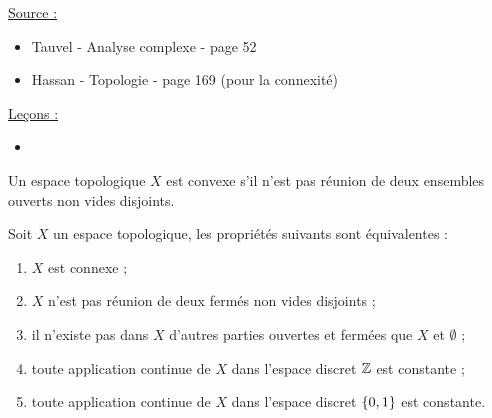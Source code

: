 

\pagestyle{fancy}

\fancyhead[C]{}
\fancyhead[R]{}



\underline{Source :} 

\begin{itemize}
\item Tauvel - Analyse complexe - page 52
\item Hassan - Topologie - page 169 (pour la connexité)
\end{itemize}

\underline{Leçons :}
\begin{itemize}
\item
\end{itemize}

\begin{defn}
Un espace topologique $X$ est convexe s'il n'est pas réunion de deux ensembles ouverts non vides disjoints.
\end{defn}

\begin{thm}
Soit $X$ un espace topologique, les propriétés suivants sont équivalentes :
\begin{enumerate}
\item $X$ est connexe ;
\item $X$ n'est pas réunion de deux fermés non vides disjoints ;
\item il n'existe pas dans $X$ d'autres parties ouvertes et fermées que $X$ et $\emptyset$ ;
\item toute application continue de $X$ dans l'espace discret $\mathbb{Z}$ est constante ;
\item toute application continue de $X$ dans l'espace discret $\{ 0,1 \}$ est constante.
\end{enumerate}
\end{thm}

